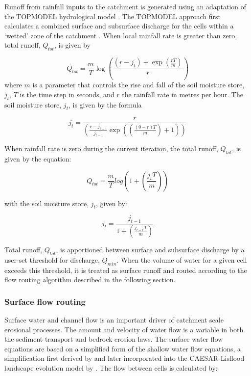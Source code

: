 Runoff from rainfall inputs to the catchment is generated using an adaptation of the TOPMODEL hydrological model \citep{beven1979physically}. The TOPMODEL approach first calculates a combined surface and subsurface discharge for the cells within a `wetted' zone of the catchment \citep{coulthard2002cellular}. When local rainfall rate is greater than zero, total runoff, \(Q_{tot}\), is given by 

\begin{equation}
Q_{tot} = \frac{m}{T} \log \left( \frac{(r-j_t) + \exp \left(\frac{rT}{m} \right)}{r} \right)
\end{equation}
where \(m\) is a parameter that controls the rise and fall of the soil moisture store, \(j_t\), \(T\) is the time step in seconds, and \(r\) the rainfall rate in metres per hour. The soil moisture store, \(j_t\), is given by the formula

\begin{equation}
j_t = \frac{r}  { \left(  \frac{r-j_{t-1}}{j_{t-1}  } \exp \left( \left( \frac{(0-r)T}{m}\right) +1 \right) \right)}
\end{equation}

When rainfall rate is zero during the current iteration, the total runoff, \(Q_{tot}\), is given by the equation:

\begin{equation}
Q_{tot} =  \frac{m}{T} log \left( 1 + \left( \frac{j_t  T}{m} \right) \right)
\end{equation}

with the soil moisture store, \(j_t\), given by:

\begin{equation}
j_t = \frac{j_{t-1}}{1 + \left( \frac{j_{t-1}T}{m} \right) }
\end{equation}

Total runoff, \(Q_{tot}\), is apportioned between surface and subsurface discharge by a user-set threshold for discharge, \(Q_{min}\). When the volume of water for a given cell exceeds this threshold, it is treated as surface runoff and routed according to the flow routing algorithm described in the following section.

%

\subsubsection{Surface flow routing}
Surface water and channel flow is an important driver of catchment scale erosional processes. The amount and velocity of water flow is a variable in both the sediment transport and bedrock erosion laws. The surface water flow equations are based on a simplified form of the shallow water flow equations, a simplification first derived by \citet{bates2010simple} and later incorporated into the CAESAR-Lisflood landscape evolution model by \citep{Coulthard2013}. The flow between cells is calculated by:

